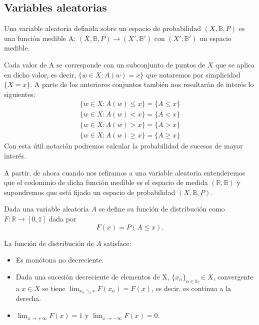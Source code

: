 \documentclass[../proyecto.tex]{memoir}
\begin{document}
\subsection{Variables aleatorias}

\begin{defi}
Una variable aleatoria definida sobre un espacio de probabilidad $(X, \mathds{B}, P)$ es una función medible A: $(X, \mathds{B}, P) \rightarrow  (X', \mathds{B}')$ con $(X', \mathds{B}')$ un espacio medible.
\end{defi}

Cada valor de A se corresponde con un subconjunto de puntos de $X$ que se aplica en dicho valor, es decir, $ \{ w\in X : A(w)=x\}$ que notaremos por simplicidad $\{X = x\}$. A parte de los anteriores conjuntos también nos resultarán de interés lo siguientes:
\begin{align*}
\{ w\in X : A(w) \leq x\} = \{ A \leq x \} \\
\{ w\in X : A(w) < x\} = \{ A < x \} \\
\{ w\in X : A(w) > x\} = \{ A > x \} \\
\{ w\in X : A(w) \geq x\} = \{ A \geq x \}
\end{align*}
Con esta útil notación podremos calcular la probabilidad de sucesos de mayor interés.

A partir, de ahora cuando nos refiramos a una variable aleatoria entenderemos que el codominio de dicha función medible es el espacio de medida $(\mathds{R},\mathds{B})$ y supondremos que está fijado un espacio de probabilidad $(X, \mathds{B}, P)$.

\begin{defi}
Dada una variable aleatoria $A$ se define su función de distribución como $ F : \mathds{R} \rightarrow [0,1] $ dada por 
$$
F(x)=P(A \leq x).
$$
\end{defi}

\begin{prop}
La función de distribución de $A$ satisface:

\begin{itemize}
\item Es monótona no decreciente.
\item Dada una sucesión decreciente de elementos de X, $\{x_n\}_{n \in \mathds{N}} \in X$, convergente a $x\in X$ se tiene $\lim_{x_n \searrow x} F(x_n) = F(x)$, es decir, es continua a la derecha. 
\item $\lim_{x\to+\infty} F(x) = 1$ y $\lim_{x\to-\infty} F(x) = 0$.
\end{itemize}

\end{prop}
\end{document}

